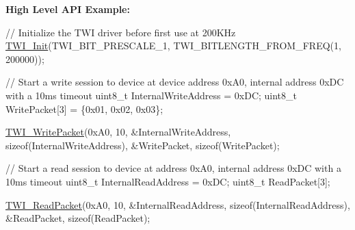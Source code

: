 {\bfseries High Level A\-P\-I Example\-:} 
\begin{DoxyCode}
\textcolor{comment}{// Initialize the TWI driver before first use at 200KHz}
\hyperlink{TWI__AVR8_8c_a08e1eb463ce4ec168f2c1cb9b4039cae}{TWI\_Init}(TWI\_BIT\_PRESCALE\_1, TWI\_BITLENGTH\_FROM\_FREQ(1, 200000));

\textcolor{comment}{// Start a write session to device at device address 0xA0, internal address 0xDC with a 10ms timeout}
uint8\_t InternalWriteAddress = 0xDC;
uint8\_t WritePacket[3] = \{0x01, 0x02, 0x03\};

\hyperlink{TWI__AVR8_8c_a7a9c708e4d9fbe6ed807f582bcbded0e}{TWI\_WritePacket}(0xA0, 10, &InternalWriteAddress, \textcolor{keyword}{sizeof}(InternalWriteAddress),
                &WritePacket, \textcolor{keyword}{sizeof}(WritePacket);

\textcolor{comment}{// Start a read session to device at address 0xA0, internal address 0xDC with a 10ms timeout}
uint8\_t InternalReadAddress = 0xDC;
uint8\_t ReadPacket[3];

\hyperlink{TWI__AVR8_8c_aea02d723a16ed7f11d485c24175d8117}{TWI\_ReadPacket}(0xA0, 10, &InternalReadAddress, \textcolor{keyword}{sizeof}(InternalReadAddress),
               &ReadPacket, \textcolor{keyword}{sizeof}(ReadPacket);
\end{DoxyCode}
 